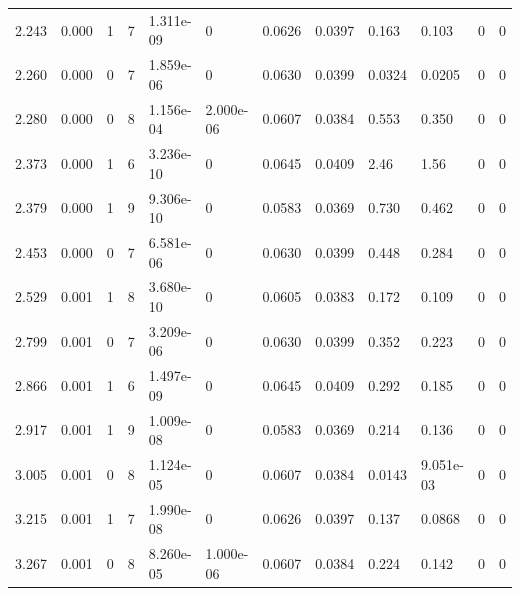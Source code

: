 \documentclass[preview]{standalone}
\begin{document}
{{\begin{tabular}{L{1.2cm}C{1.2cm} C{0.3cm}C{0.5cm} C{1.4cm}C{1.4cm} C{1.4cm}C{1.4cm} C{1.6cm}C{1.6cm} C{1.6cm}C{1.6cm}}
  2.243  &  0.000  & 1     &  7 &  1.311e-09  & 0  &  0.0626&   0.0397& 0.163 & 0.103   &  0 & 0  \\ 
  2.260  &  0.000  & 0     &  7 &  1.859e-06  & 0  &  0.0630&   0.0399& 0.0324 & 0.0205   &  0 & 0  \\ 
  2.280  &  0.000  & 0     &  8 &  1.156e-04  & 2.000e-06  &  0.0607&   0.0384& 0.553 & 0.350   &  0 & 0  \\ 
  2.373  &  0.000  & 1     &  6 &  3.236e-10  & 0  &  0.0645&   0.0409& 2.46 & 1.56   &  0 & 0  \\ 
  2.379  &  0.000  & 1     &  9 &  9.306e-10  & 0  &  0.0583&   0.0369& 0.730 & 0.462   &  0 & 0  \\ 
  2.453  &  0.000  & 0     &  7 &  6.581e-06  & 0  &  0.0630&   0.0399& 0.448 & 0.284   &  0 & 0  \\ 
  2.529  &  0.001  & 1     &  8 &  3.680e-10  & 0  &  0.0605&   0.0383& 0.172 & 0.109   &  0 & 0  \\ 
  2.799  &  0.001  & 0     &  7 &  3.209e-06  & 0  &  0.0630&   0.0399& 0.352 & 0.223   &  0 & 0  \\ 
  2.866  &  0.001  & 1     &  6 &  1.497e-09  & 0  &  0.0645&   0.0409& 0.292 & 0.185   &  0 & 0  \\ 
  2.917  &  0.001  & 1     &  9 &  1.009e-08  & 0  &  0.0583&   0.0369& 0.214 & 0.136   &  0 & 0  \\ 
  3.005  &  0.001  & 0     &  8 &  1.124e-05  & 0  &  0.0607&   0.0384& 0.0143 & 9.051e-03   &  0 & 0  \\ 
  3.215  &  0.001  & 1     &  7 &  1.990e-08  & 0  &  0.0626&   0.0397& 0.137 & 0.0868   &  0 & 0  \\ 
  3.267  &  0.001  & 0     &  8 &  8.260e-05  & 1.000e-06  &  0.0607&   0.0384& 0.224 & 0.142   &  0 & 0  \\ 
\hline 
\end{tabular} 

}}
\end{document}
